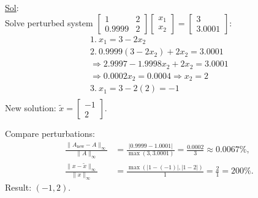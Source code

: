 \begin{enumerate}
      \underline{Sol}:\\
      Solve perturbed system \(
        \begin{bmatrix} 1 & 2 \\ 0.9999 & 2
        \end{bmatrix}
        \begin{bmatrix} x_1 \\ x_2
        \end{bmatrix} =
        \begin{bmatrix} 3 \\ 3.0001
      \end{bmatrix}\):
      \[
        \begin{array}{l}
          1.\ x_1 = 3 - 2x_2 \\
          2.\ 0.9999(3 - 2x_2) + 2x_2 = 3.0001 \\
          \Rightarrow 2.9997 - 1.9998x_2 + 2x_2 = 3.0001 \\
          \Rightarrow 0.0002x_2 = 0.0004 \Rightarrow x_2 = 2 \\
          3.\ x_1 = 3 - 2(2) = -1 \\
        \end{array}
      \]
      New solution: \(\tilde{x} =
        \begin{bmatrix} -1 \\ 2
      \end{bmatrix}\).

      Compare perturbations:
      \[
        \begin{aligned}
          \frac{\|A_{\text{new}} - A\|_\infty}{\|A\|_\infty} &=
          \frac{|0.9999 - 1.0001|}{\max(3, 3.0001)} =
          \frac{0.0002}{3} \approx 0.0067\%, \\
          \frac{\|x - \tilde{x}\|_\infty}{\|x\|_\infty} &=
          \frac{\max(|1 - (-1)|, |1 - 2|)}{1} = \frac{2}{1} = 200\%.
        \end{aligned}
      \]
      Result: \(\boxed{(-1, 2)}\).
  \end{enumerate}
